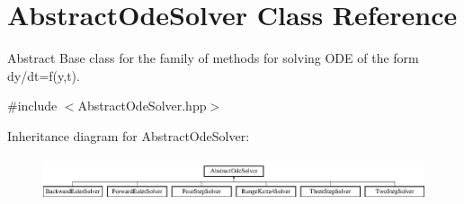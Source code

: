 \hypertarget{class_abstract_ode_solver}{}\section{Abstract\+Ode\+Solver Class Reference}
\label{class_abstract_ode_solver}


Abstract Base class for the family of methods for solving O\+D\+E of the form dy/dt=f(y,t).  




{\ttfamily \#include $<$Abstract\+Ode\+Solver.\+hpp$>$}

Inheritance diagram for Abstract\+Ode\+Solver\+:\begin{figure}[H]
\begin{center}
\leavevmode
\includegraphics[height=1.305361cm]{class_abstract_ode_solver}
\end{center}
\end{figure}
